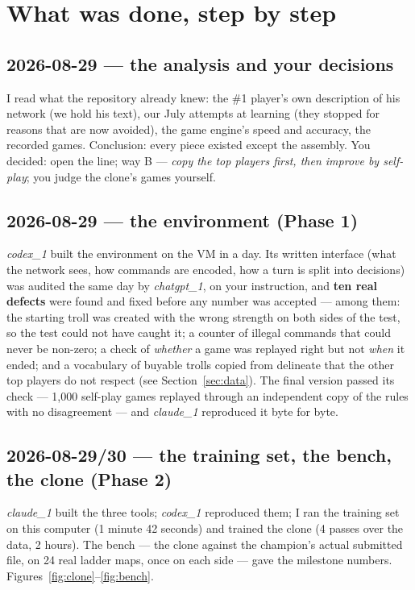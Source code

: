 \documentclass[11pt,a4paper]{article}
\begin{document}
\section{What was done, step by step}

\subsection*{2026-08-29 --- the analysis and your decisions}
I read what the repository already knew: the \#1 player's own description of his network (we hold his text), our July attempts at learning (they stopped for reasons that are now avoided), the game engine's speed and accuracy, the recorded games. Conclusion: every piece existed except the assembly. You decided: open the line; way B --- \emph{copy the top players first, then improve by self-play}; you judge the clone's games yourself.

\subsection*{2026-08-29 --- the environment (Phase 1)}
\emph{codex\_1} built the environment on the VM in a day. Its written interface (what the network sees, how commands are encoded, how a turn is split into decisions) was audited the same day by \emph{chatgpt\_1}, on your instruction, and \textbf{ten real defects} were found and fixed before any number was accepted --- among them: the starting troll was created with the wrong strength on both sides of the test, so the test could not have caught it; a counter of illegal commands that could never be non-zero; a check of \emph{whether} a game was replayed right but not \emph{when} it ended; and a vocabulary of buyable trolls copied from delineate that the other top players do not respect (see Section~\ref{sec:data}). The final version passed its check --- 1,000 self-play games replayed through an independent copy of the rules with no disagreement --- and \emph{claude\_1} reproduced it byte for byte.

\subsection*{2026-08-29/30 --- the training set, the bench, the clone (Phase 2)}
\emph{claude\_1} built the three tools; \emph{codex\_1} reproduced them; I ran the training set on this computer (1 minute 42 seconds) and trained the clone (4 passes over the data, 2 hours). The bench --- the clone against the champion's actual submitted file, on 24 real ladder maps, once on each side --- gave the milestone numbers. Figures~\ref{fig:clone}--\ref{fig:bench}.
\end{document}
